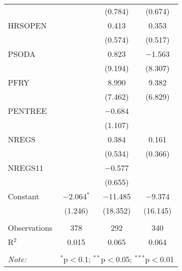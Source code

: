 \begin{table}[H]
\begin{tabular}{@{\extracolsep{5pt}}lccc}
  &  & (0.784) & (0.674) \\ 
  HRSOPEN &  & 0.413 & 0.353 \\ 
  &  & (0.574) & (0.517) \\ 
  PSODA &  & 0.823 & $-$1.563 \\ 
  &  & (9.194) & (8.307) \\ 
  PFRY &  & 8.990 & 9.382 \\ 
  &  & (7.462) & (6.829) \\ 
  PENTREE &  & $-$0.684 &  \\ 
  &  & (1.107) &  \\ 
  NREGS &  & 0.384 & 0.161 \\ 
  &  & (0.534) & (0.366) \\ 
  NREGS11 &  & $-$0.577 &  \\ 
  &  & (0.655) &  \\ 
  Constant & $-$2.064$^{*}$ & $-$11.485 & $-$9.374 \\ 
  & (1.246) & (18.352) & (16.145) \\ 
 \hline \\[-1.8ex] 
Observations & 378 & 292 & 340 \\ 
R$^{2}$ & 0.015 & 0.065 & 0.064 \\ 
\hline 
\hline \\[-1.8ex] 
\textit{Note:}  & \multicolumn{3}{r}{$^{*}$p$<$0.1; $^{**}$p$<$0.05; $^{***}$p$<$0.01} \\ 
\end{tabular} 
\end{table} 

